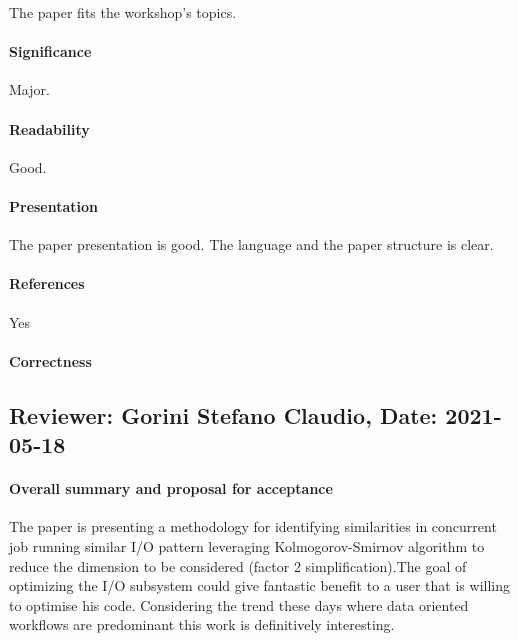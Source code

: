 \documentclass{jhps}
\begin{document}
The paper fits the workshop’s topics.

\paragraph{Significance}   %

Major.

\paragraph{Readability}   %

Good.

\paragraph{Presentation}

The paper presentation is good. The language and the paper structure is clear.

\paragraph{References}   %

Yes

\paragraph{Correctness}   %


\subsection*{Reviewer: Gorini Stefano Claudio, Date: 2021-05-18}

\paragraph{Overall summary and proposal for acceptance}

The paper is presenting a methodology for identifying similarities in concurrent job running similar I/O pattern leveraging Kolmogorov-Smirnov algorithm to reduce the dimension to be considered (factor 2 simplification).The goal of optimizing the I/O subsystem could give fantastic benefit to a user that is willing to optimise his code. Considering the trend these days where data oriented workflows are predominant this work is definitively interesting.
\end{document}
